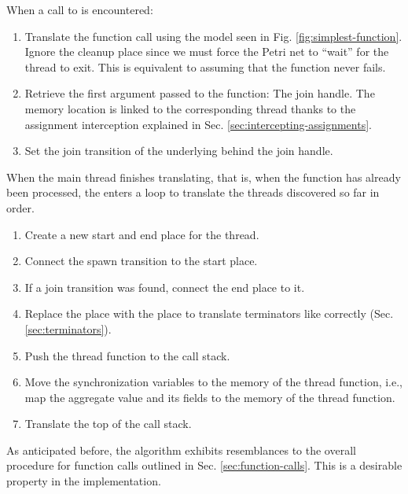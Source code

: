 When a call to  is encountered:

\begin{enumerate}
      \item Translate the function call using the model seen in Fig. \ref{fig:simplest-function}.
            Ignore the cleanup place since we must force the Petri net
            to ``wait'' for the thread to exit.
            This is equivalent to assuming that the  function never fails.
      \item Retrieve the first argument passed to the function: The join handle.
            The memory location is linked to the corresponding thread
            thanks to the assignment interception explained in Sec. \ref{sec:intercepting-assignments}.
      \item Set the join transition of the underlying  behind the join handle.
\end{enumerate}

When the main thread finishes translating, that is,
when the  function has already been processed,
the  enters a loop
to translate the threads discovered so far in order.

\begin{enumerate}
      \item Create a new start and end place for the thread.
      \item Connect the spawn transition to the start place.
      \item If a join transition was found, connect the end place to it.
      \item Replace the place  with the place 
            to translate terminators like  correctly (Sec. \ref{sec:terminators}).
      \item Push the thread function to the call stack.
      \item Move the synchronization variables to the memory of the thread function, i.e.,
            map the aggregate value and its fields to the memory of the thread function.
      \item Translate the top of the call stack.
\end{enumerate}

As anticipated before, the algorithm exhibits resemblances
to the overall procedure for function calls outlined in Sec. \ref{sec:function-calls}.
This is a desirable property in the implementation.